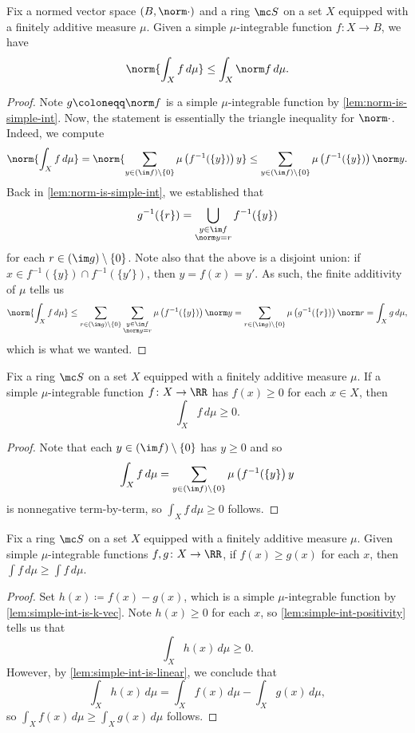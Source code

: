 \documentclass[../notes.tex]{subfiles}
\begin{document}
\begin{lemma} \label{lem:simple-bound-norm-int}
	Fix a normed vector space $(B,\norm\cdot)$ and a ring $\mc S$ on a set $X$ equipped with a finitely additive measure $\mu$. Given a simple $\mu$-integrable function $f\colon X\to B$, we have
	\[\norm{\int_Xf\,d\mu}\le\int_X\norm f\,d\mu.\]
\end{lemma}
\begin{proof}
	Note $g\coloneqq\norm f$ is a simple $\mu$-integrable function by \autoref{lem:norm-is-simple-int}. Now, the statement is essentially the triangle inequality for $\norm\cdot$. Indeed, we compute
	\[\norm{\int_Xf\,d\mu}=\norm{\sum_{y\in(\im f)\setminus\{0\}}\mu\left(f^{-1}(\{y\})\right)y}\le\sum_{y\in(\im f)\setminus\{0\}}\mu\left(f^{-1}(\{y\})\right)\norm y.\]
	Back in \autoref{lem:norm-is-simple-int}, we established that
	\[g^{-1}(\{r\})=\bigcup_{\substack{y\in\im f\\\norm y=r}}f^{-1}(\{y\})\]
	for each $r\in(\im g)\setminus\{0\}$. Note also that the above is a disjoint union: if $x\in f^{-1}(\{y\})\cap f^{-1}(\{y'\})$, then $y=f(x)=y'$. As such, the finite additivity of $\mu$ tells us
	\[\norm{\int_Xf\,d\mu}\le\sum_{r\in(\im g)\setminus\{0\}}\sum_{\substack{y\in\im f\\\norm y=r}}\mu\left(f^{-1}(\{y\})\right)\norm y=\sum_{r\in(\im g)\setminus\{0\}}\mu\left(g^{-1}(\{r\})\right)\norm r=\int_Xg\,d\mu,\]
	which is what we wanted.
\end{proof}
\begin{lemma} \label{lem:simple-int-positivity}
	Fix a ring $\mc S$ on a set $X$ equipped with a finitely additive measure $\mu$. If a simple $\mu$-integrable function $f\colon X\to\RR$ has $f(x)\ge0$ for each $x\in X$, then
	\[\int_Xf\,d\mu\ge0.\]
\end{lemma}
\begin{proof}
	Note that each $y\in(\im f)\setminus\{0\}$ has $y\ge0$ and so
	\[\int_Xf\,d\mu=\sum_{y\in(\im f)\setminus\{0\}}\mu\left(f^{-1}(\{y\}\right)y\]
	is nonnegative term-by-term, so $\int_Xf\,d\mu\ge0$ follows.
\end{proof}
\begin{cor} \label{cor:simple-bound-ints}
	Fix a ring $\mc S$ on a set $X$ equipped with a finitely additive measure $\mu$. Given simple $\mu$-integrable functions $f,g\colon X\to\RR$, if $f(x)\ge g(x)$ for each $x$, then $\int f\,d\mu\ge\int f\,d\mu$.
\end{cor}
\begin{proof}
	Set $h(x)\coloneqq f(x)-g(x)$, which is a simple $\mu$-integrable function by \autoref{lem:simple-int-is-k-vec}. Note $h(x)\ge0$ for each $x$, so \autoref{lem:simple-int-positivity} tells us that
	\[\int_Xh(x)\,d\mu\ge0.\]
	However, by \autoref{lem:simple-int-is-linear}, we conclude that
	\[\int_Xh(x)\,d\mu=\int_Xf(x)\,d\mu-\int_Xg(x)\,d\mu,\]
	so $\int_Xf(x)\,d\mu\ge\int_Xg(x)\,d\mu$ follows.
\end{proof}
\end{document}
